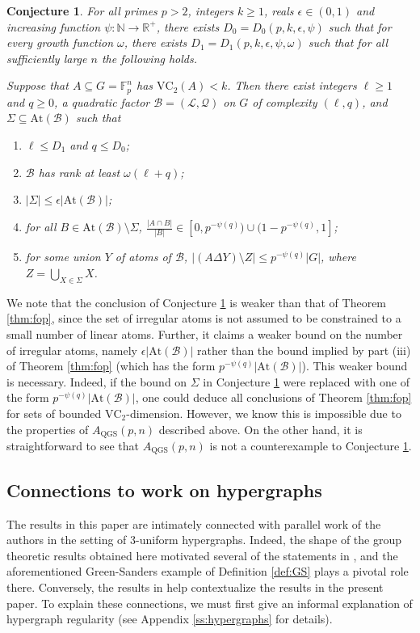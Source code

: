 \documentclass[12pt,oneside,british,a4wide]{amsart}
\newtheorem{conjecture}[theorem]{Conjecture}
\numberwithin{equation}{section}
\theoremstyle{definition}
\def\F{\mathbb{F}}
\def\VC{\mathrm{VC}}
\def\QGS{\mathrm{QGS}}
\def\e{\epsilon}
\newcommand{\calL}{\mathcal{L}}
\newcommand{\calB}{\mathcal{B}}
\newcommand{\calQ}{\mathcal{Q}}
\newcommand{\At}{{\mathrm{At}}}
\begin{document}
\begin{conjecture}\label{con:strucVC2}
 For all primes $p>2$, integers $k\geq 1$, reals $\e\in (0,1)$ and increasing function $\psi:\mathbb{N}\rightarrow \mathbb{R}^+$, there exists $D_0=D_0(p, k,\e,\psi)$ such that for every growth function $\omega$, there exists $D_1=D_1(p, k,\e,\psi,\omega)$  such that for all sufficiently large $n$ the following holds. 

Suppose that $A\subseteq G=\F_p^n$ has $\VC_2(A)<k$.  Then there exist integers $\ell\geq 1$ and $q\geq 0$, a quadratic factor $\calB=(\calL,\calQ)$ on $G$ of complexity $(\ell,q)$, and $\Sigma\subseteq \At(\calB)$ such that
\begin{enumerate}[label=\normalfont(\roman*)]
\item $\ell\leq D_1$ and  $q\leq D_0$;
\item  $\calB$ has rank at least $\omega(\ell+q)$; 
 \item $|\Sigma|\leq \e |\At(\calB)|$;
\item for all $B\in \At(\calB)\setminus \Sigma$, $\frac{|A\cap B|}{|B|}\in [0,p^{-\psi(q)})\cup (1-p^{-\psi(q)},1]$;
\item for some union $Y$ of atoms of $\calB$,  $|(A\Delta Y)\setminus Z|\leq p^{-\psi(q)}|G|$, where $Z=\bigcup_{X\in \Sigma}X$.
\end{enumerate}
\end{conjecture}

We note that the conclusion of Conjecture \ref{con:strucVC2} is weaker than that of Theorem \ref{thm:fop}, since the set of irregular atoms is not assumed to be constrained to a small number of linear atoms.  Further, it claims a weaker bound on the number of irregular atoms, namely $\e |\At(\calB)|$ rather than the bound implied by part (iii) of Theorem \ref{thm:fop} (which has the form $p^{-\psi(q)}|\At(\calB)|$). This weaker bound is necessary. Indeed, if the bound on $\Sigma$ in Conjecture \ref{con:strucVC2} were replaced with one of the form $p^{-\psi(q)}|\At(\calB)|$, one could deduce all conclusions of Theorem \ref{thm:fop} for sets of bounded $\VC_2$-dimension.  However, we know this is impossible due to the properties of $A_{\QGS}(p,n)$ described above.  On the other hand, it is straightforward to see that $A_{\QGS}(p,n)$ is not a counterexample to Conjecture \ref{con:strucVC2}.   
 

\subsection{Connections to work on hypergraphs}\label{subsec:discussion}
The results in this paper are intimately connected with parallel work of the authors \cite{Terry.2021b} in the setting of 3-uniform hypergraphs. Indeed, the shape of the group theoretic results obtained here motivated several of the statements in \cite{Terry.2021b}, and the aforementioned Green-Sanders example of Definition \ref{def:GS} plays a pivotal role there. Conversely, the results in \cite{Terry.2021b} help contextualize the results in the present paper. To explain these connections, we must first give an informal explanation of hypergraph regularity (see Appendix \ref{ss:hypergraphs} for details). 
\end{document}
